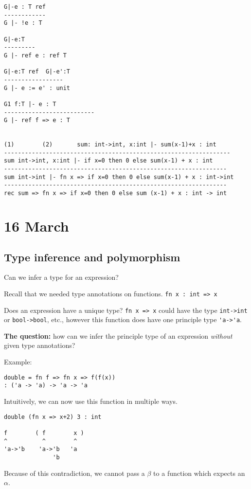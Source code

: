 \documentclass[11pt]{article}
\begin{document}
\begin{verbatim}
G|-e : T ref
------------
G |- !e : T

G|-e:T
---------
G |- ref e : ref T

G|-e:T ref  G|-e':T
-----------------
G |- e := e' : unit

G1 f:T |- e : T
--------------------------
G |- ref f => e : T


(1)        (2)       sum: int->int, x:int |- sum(x-1)+x : int
-----------------------------------------------------------------
sum int->int, x:int |- if x=0 then 0 else sum(x-1) + x : int
----------------------------------------------------------------
sum int->int |- fn x => if x=0 then 0 else sum(x-1) + x : int->int
----------------------------------------------------------------
rec sum => fn x => if x=0 then 0 else sum (x-1) + x : int -> int
\end{verbatim}


\section{16 March}
\subsection{Type inference and polymorphism}
Can we infer a type for an expression?

Recall that we needed type annotations on functions. \verb~fn x : int => x~

Does an expression have a unique type? \verb~fn x => x~ could have the type \verb~int->int~ or \verb~bool->bool~, etc., however this function does have one principle type \verb~'a->'a~.

\textbf{The question:} how can we infer the principle type of an expression \emph{without} given type annotations?

Example:
\begin{verbatim}
double = fn f => fn x => f(f(x))
: ('a -> 'a) -> 'a -> 'a
\end{verbatim}

Intuitively, we can now use this function in multiple ways.
\begin{verbatim}
double (fn x => x+2) 3 : int

f        ( f        x )
^          ^        ^
'a->'b    'a->'b   'a
              'b
\end{verbatim}
Because of this contradiction, we cannot pass a $\beta$ to a function which expects an $\alpha$.
\end{document}
